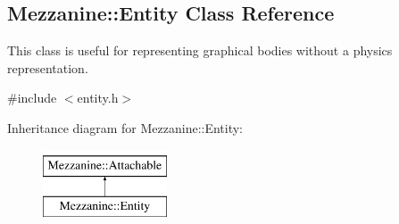 \hypertarget{classMezzanine_1_1Entity}{
\subsection{Mezzanine::Entity Class Reference}
\label{classMezzanine_1_1Entity}
}


This class is useful for representing graphical bodies without a physics representation.  




{\ttfamily \#include $<$entity.h$>$}

Inheritance diagram for Mezzanine::Entity:\begin{figure}[H]
\begin{center}
\leavevmode
\includegraphics[height=2.000000cm]{classMezzanine_1_1Entity}
\end{center}
\end{figure}
